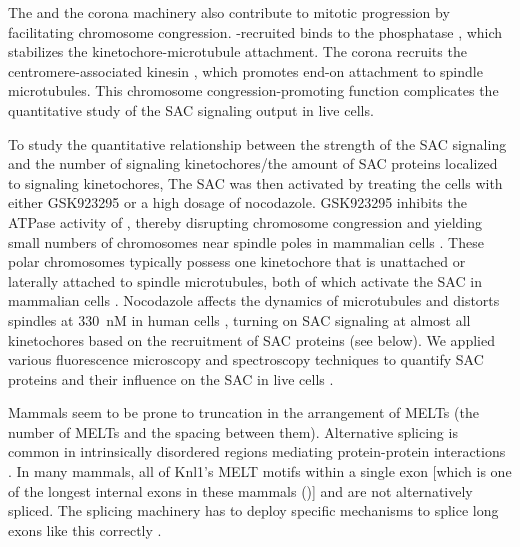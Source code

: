 The  and the corona machinery also contribute to mitotic progression by facilitating chromosome congression. -recruited  binds to the phosphatase , which stabilizes the kinetochore-microtubule attachment. The corona recruits the centromere-associated kinesin , which promotes end-on attachment to spindle microtubules. This chromosome congression-promoting function complicates the quantitative study of the SAC signaling output in live cells.

To study the quantitative relationship between the strength of the SAC signaling and the number of signaling kinetochores/the amount of SAC proteins localized to signaling kinetochores, The SAC was then activated by treating the cells with either GSK923295 or a high dosage of nocodazole. GSK923295 inhibits the ATPase activity of , thereby disrupting chromosome congression and yielding small numbers of chromosomes near spindle poles in mammalian cells \cite{GSK923295}.
These polar chromosomes typically possess one kinetochore that is unattached or laterally attached to spindle microtubules, both of which activate the SAC in mammalian cells \cite{GSK923295MonastrolCotreatment,GSK923295LateralAttachmentEM,LateralAttachmentSAC}.
Nocodazole affects the dynamics of microtubules and distorts spindles at \SI{330}{nM} in human cells \cite{TypeIIISpindle_330nMNoc, RPE1+Noc}, turning on SAC signaling at almost all kinetochores based on the recruitment of SAC proteins (see below). We applied various fluorescence microscopy and spectroscopy techniques to quantify SAC proteins and their influence on the SAC in live cells \cite{eSAC}. %


Mammals seem to be prone to truncation in the arrangement of MELTs (the number of MELTs and the spacing between them). Alternative splicing is common in intrinsically disordered regions mediating protein-protein interactions \cite{DisorderedRegionsAlternativeSplicing}. In many mammals, all of Knl1's MELT motifs within a single exon [which is one of the longest internal exons in these mammals ()] and are not alternatively spliced. The splicing machinery has to deploy specific mechanisms to splice long exons like this correctly \cite{InternalExon}.

